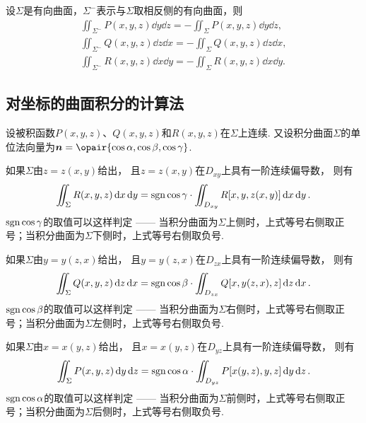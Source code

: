 \begin{property}
设\(\Sigma\)是有向曲面，\(\Sigma^-\)表示与\(\Sigma\)取相反侧的有向曲面，则\begin{gather*}
\iint_{\Sigma^-} P(x,y,z) \dd{y}\dd{z} = -\iint_{\Sigma} P(x,y,z) \dd{y}\dd{z}, \\
\iint_{\Sigma^-} Q(x,y,z) \dd{z}\dd{x} = -\iint_{\Sigma} Q(x,y,z) \dd{z}\dd{x}, \\
\iint_{\Sigma^-} R(x,y,z) \dd{x}\dd{y} = -\iint_{\Sigma} R(x,y,z) \dd{x}\dd{y}.
\end{gather*}
\end{property}

\subsection{对坐标的曲面积分的计算法}
\begin{theorem}
设被积函数\(P(x,y,z)\)、\(Q(x,y,z)\)和\(R(x,y,z)\)在\(\Sigma\)上连续.
又设积分曲面\(\Sigma\)的单位法向量为\(\mat{n} = \opair{\cos\alpha,\cos\beta,\cos\gamma}\).

如果\(\Sigma\)由\(z=z(x,y)\)给出，%
且\(z=z(x,y)\)在\(D_{xy}\)上具有一阶连续偏导数，%
则有\begin{equation}\label{equation:线积分与面积分.第二类曲面积分的计算式1}
\iint_{\Sigma} R(x,y,z) \dd{x}\dd{y}
= \operatorname{sgn}\cos\gamma \cdot \iint_{D_{xy}} R[x,y,z(x,y)] \dd{x}\dd{y}.
\end{equation}
\(\operatorname{sgn}\cos\gamma\)的取值可以这样判定 —— 当积分曲面为\(\Sigma\)上侧时，上式等号右侧取正号；当积分曲面为\(\Sigma\)下侧时，上式等号右侧取负号.

如果\(\Sigma\)由\(y=y(z,x)\)给出，%
且\(y=y(z,x)\)在\(D_{zx}\)上具有一阶连续偏导数，%
则有\begin{equation}\label{equation:线积分与面积分.第二类曲面积分的计算式2}
\iint_{\Sigma} Q(x,y,z) \dd{z}\dd{x}
= \operatorname{sgn}\cos\beta \cdot \iint_{D_{zx}} Q[x,y(z,x),z] \dd{z}\dd{x}.
\end{equation}
\(\operatorname{sgn}\cos\beta\)的取值可以这样判定 —— 当积分曲面为\(\Sigma\)右侧时，上式等号右侧取正号；当积分曲面为\(\Sigma\)左侧时，上式等号右侧取负号.

如果\(\Sigma\)由\(x=x(y,z)\)给出，%
且\(x=x(y,z)\)在\(D_{yz}\)上具有一阶连续偏导数，%
则有\begin{equation}\label{equation:线积分与面积分.第二类曲面积分的计算式3}
\iint_{\Sigma} P(x,y,z) \dd{y}\dd{z}
= \operatorname{sgn}\cos\alpha \cdot \iint_{D_{yz}} P[x(y,z),y,z] \dd{y}\dd{z}.
\end{equation}
\(\operatorname{sgn}\cos\alpha\)的取值可以这样判定 —— 当积分曲面为\(\Sigma\)前侧时，上式等号右侧取正号；当积分曲面为\(\Sigma\)后侧时，上式等号右侧取负号.
\end{theorem}

